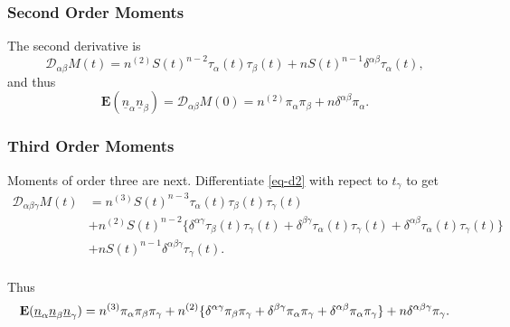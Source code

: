 \documentclass[
  12pt,
  letterpaper,
  DIV=11,
  numbers=noendperiod]{scrartcl}
\newcommand{\ul}[1]{\underline{#1}}
\begin{document}
\subsubsection{Second Order Moments}\label{second-order-moments}

The second derivative is \begin{equation}
\mathcal{D}_{\alpha\beta}M(t)=n^{(2)}S(t)^{n-2}\tau_\alpha(t)\tau_\beta(t)+nS(t)^{n-1}\delta^{\alpha\beta}\tau_\alpha(t),\label{eq-d2}
\end{equation} and thus \begin{equation}
\mathbf{E}(\ul{n}_\alpha\ul{n}_\beta)=\mathcal{D}_{\alpha\beta}M(0)=n^{(2)}\pi_\alpha\pi_\beta+n\delta^{\alpha\beta}\pi_\alpha.\label{eq-enab}
\end{equation}

\subsubsection{Third Order Moments}\label{third-order-moments}

Moments of order three are next. Differentiate \eqref{eq-d2} with repect
to \(t_\gamma\) to get \begin{subequations}
\begin{align}
\mathcal{D}_{\alpha\beta\gamma}M(t)&=n^{(3)}S(t)^{n-3}\tau_\alpha(t)\tau_\beta(t)\tau_\gamma(t)\label{eq-d3a}\\
&+n^{(2)}S(t)^{n-2}\{\delta^{\alpha\gamma}\tau_\beta(t)\tau_\gamma(t)+\delta^{\beta\gamma}\tau_\alpha(t)\tau_\gamma(t)+\delta^{\alpha\beta}\tau_\alpha(t)\tau_\gamma(t)\}\label{eq-d3b}\\
&+nS(t)^{n-1}\delta^{\alpha\beta\gamma}\tau_\gamma(t)\label{eq-d3c}.
\end{align}
\end{subequations}\\
Thus \begin{equation}
\mathbf{E}(\ul{n}_\alpha\ul{n}_\beta\ul{n}_\gamma)=\\n^{(3)}\pi_\alpha\pi_\beta\pi_\gamma+n^{(2)}\{\delta^{\alpha\gamma}\pi_\beta\pi_\gamma+\delta^{\beta\gamma}\pi_\alpha\pi_\gamma+\delta^{\alpha\beta}\pi_\alpha\pi_\gamma\}+n\delta^{\alpha\beta\gamma}\pi_\gamma.\label{eq-enabg}
\end{equation}
\end{document}
